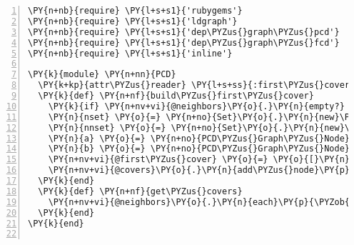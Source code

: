 \begin{Verbatim}[commandchars=\\\{\},numbers=left,firstnumber=1,stepnumber=1,xleftmargin=7mm, fontsize=\small]
\PY{n+nb}{require} \PY{l+s+s1}{'rubygems'}
\PY{n+nb}{require} \PY{l+s+s1}{'ldgraph'}
\PY{n+nb}{require} \PY{l+s+s1}{'dep\PYZus{}graph\PYZus{}pcd'}
\PY{n+nb}{require} \PY{l+s+s1}{'dep\PYZus{}graph\PYZus{}fcd'}
\PY{n+nb}{require} \PY{l+s+s1}{'inline'}

\PY{k}{module} \PY{n+nn}{PCD}
  \PY{k+kp}{attr\PYZus{}reader} \PY{l+s+ss}{:first\PYZus{}cover}
  \PY{k}{def} \PY{n+nf}{build\PYZus{}first\PYZus{}cover}
    \PY{k}{if} \PY{n+nv+vi}{@neighbors}\PY{o}{.}\PY{n}{empty?} \PY{k}{then} \PY{k}{return} \PY{l+s+ss}{:empty} \PY{k}{end}
    \PY{n}{nset} \PY{o}{=} \PY{n+no}{Set}\PY{o}{.}\PY{n}{new}\PY{p}{(}\PY{n+nv+vi}{@neighbors}\PY{p}{)}
    \PY{n}{nnset} \PY{o}{=} \PY{n+no}{Set}\PY{o}{.}\PY{n}{new}\PY{p}{(}\PY{n+nv+vi}{@neighbors}\PY{o}{.}\PY{n}{collect}\PY{p}{\PYZob{}}\PY{o}{|}\PY{n}{k}\PY{o}{|} \PY{n}{k}\PY{o}{.}\PY{n}{neighbors}\PY{p}{\PYZcb{}}\PY{o}{.}\PY{n}{flatten}\PY{p}{)}\PY{o}{-}\PY{n}{nset}
    \PY{n}{a} \PY{o}{=} \PY{n+no}{PCD\PYZus{}Graph\PYZus{}Node}\PY{o}{.}\PY{n}{new}\PY{p}{(}\PY{n}{nset}\PY{o}{.}\PY{n}{to\PYZus{}a}\PY{p}{)}
    \PY{n}{b} \PY{o}{=} \PY{n+no}{PCD\PYZus{}Graph\PYZus{}Node}\PY{o}{.}\PY{n}{new}\PY{p}{(}\PY{n}{nnset}\PY{o}{.}\PY{n}{to\PYZus{}a}\PY{p}{)}
    \PY{n+nv+vi}{@first\PYZus{}cover} \PY{o}{=} \PY{o}{[}\PY{n}{a}\PY{p}{,}\PY{n}{b}\PY{o}{]}\PY{o}{.}\PY{n}{min}
    \PY{n+nv+vi}{@covers}\PY{o}{.}\PY{n}{add\PYZus{}node}\PY{p}{(}\PY{n+nv+vi}{@first\PYZus{}cover}\PY{p}{)}
  \PY{k}{end}
  \PY{k}{def} \PY{n+nf}{get\PYZus{}covers}
    \PY{n+nv+vi}{@neighbors}\PY{o}{.}\PY{n}{each}\PY{p}{\PYZob{}}\PY{o}{|}\PY{n}{k}\PY{o}{|}  \PY{n+nv+vi}{@covers}\PY{o}{.}\PY{n}{add\PYZus{}node}\PY{p}{(}\PY{n}{k}\PY{o}{.}\PY{n}{first\PYZus{}cover}\PY{o}{.}\PY{n}{dup}\PY{p}{)}\PY{p}{\PYZcb{}}
  \PY{k}{end}
\PY{k}{end}


\end{Verbatim}
